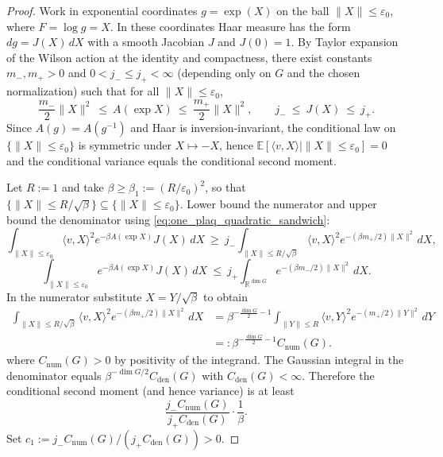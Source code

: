 \begin{proof}
Work in exponential coordinates $g=\exp(X)$ on the ball $\|X\|\le \varepsilon_0$, where $F=\log g=X$.
In these coordinates Haar measure has the form $dg=J(X)\,dX$ with a smooth Jacobian $J$ and $J(0)=1$.
By Taylor expansion of the Wilson action at the identity and compactness, there exist constants $m_-,m_+>0$ and $0<j_-\le j_+<\infty$ (depending only on $G$ and the chosen normalization) such that for all $\|X\|\le \varepsilon_0$,
\begin{equation}\label{eq:one_plaq_quadratic_sandwich}
\frac{m_-}{2}\|X\|^2 \ \le\ A(\exp X)\ \le\ \frac{m_+}{2}\|X\|^2,
\qquad
j_- \ \le\ J(X)\ \le\ j_+.
\end{equation}
Since $A(g)=A(g^{-1})$ and Haar is inversion-invariant, the conditional law on $\{\|X\|\le \varepsilon_0\}$ is symmetric under $X\mapsto -X$, hence
$\mathbb E[\langle v,X\rangle\mid \|X\|\le \varepsilon_0]=0$ and the conditional variance equals the conditional second moment.

Let $R:=1$ and take $\beta\ge \beta_1:=(R/\varepsilon_0)^2$, so that $\{\|X\|\le R/\sqrt{\beta}\}\subseteq \{\|X\|\le \varepsilon_0\}$.
Lower bound the numerator and upper bound the denominator using \eqref{eq:one_plaq_quadratic_sandwich}:
\[
\int_{\|X\|\le \varepsilon_0} \langle v,X\rangle^2 e^{-\beta A(\exp X)}J(X)\,dX
\ \ge\
j_- \int_{\|X\|\le R/\sqrt{\beta}} \langle v,X\rangle^2 e^{-(\beta m_+/2)\|X\|^2}\,dX,
\]
\[
\int_{\|X\|\le \varepsilon_0} e^{-\beta A(\exp X)}J(X)\,dX
\ \le\
j_+ \int_{\mathbb R^{\dim G}} e^{-(\beta m_-/2)\|X\|^2}\,dX.
\]
In the numerator substitute $X=Y/\sqrt{\beta}$ to obtain
\[
\begin{aligned}
\int_{\|X\|\le R/\sqrt{\beta}} \langle v,X\rangle^2 e^{-(\beta m_+/2)\|X\|^2}\,dX
&=
\beta^{-\frac{\dim G}{2}-1}
\int_{\|Y\|\le R} \langle v,Y\rangle^2 e^{-(m_+/2)\|Y\|^2}\,dY\\
&=:\beta^{-\frac{\dim G}{2}-1} C_{\mathrm{num}}(G).
\end{aligned}
\]
where $C_{\mathrm{num}}(G)>0$ by positivity of the integrand.
The Gaussian integral in the denominator equals $\beta^{-\dim G/2}C_{\mathrm{den}}(G)$ with $C_{\mathrm{den}}(G)<\infty$.
Therefore the conditional second moment (and hence variance) is at least
\[
\frac{j_- C_{\mathrm{num}}(G)}{j_+ C_{\mathrm{den}}(G)}\cdot \frac{1}{\beta}.
\]
Set $c_1:=j_- C_{\mathrm{num}}(G)/(j_+ C_{\mathrm{den}}(G))>0$.
\end{proof}

